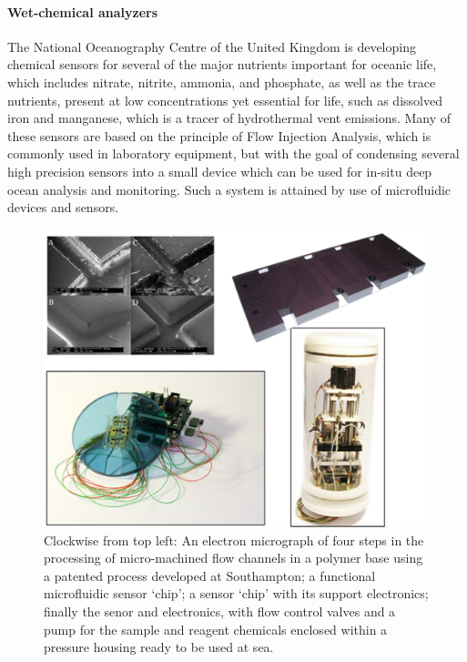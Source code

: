 {\paragraph{Wet-chemical analyzers \cite{chemical_microsensors}}
The National Oceanography Centre of the United Kingdom is developing chemical sensors for several of the major nutrients important for oceanic life, which includes nitrate, nitrite, ammonia, and phosphate, as well as the trace nutrients, present at low concentrations yet essential for life, such as dissolved iron and manganese, which is a tracer of hydrothermal vent emissions.  Many of these sensors are based on the principle of Flow Injection Analysis, which is commonly used in laboratory equipment, but with the goal of condensing several high precision sensors into a small device which can be used for in-situ deep ocean analysis and monitoring. Such a system is attained by use of microfluidic devices and sensors.
\begin{figure}[htb]
	\centering
	\includegraphics[width=\textwidth]{figures/mlh/microsensors_chem_img1.png}
	\caption{Clockwise from top left: An electron micrograph of four steps in the processing of micro-machined flow channels in a polymer base using a patented process developed at Southampton; a functional microfluidic sensor ‘chip’; a sensor ‘chip’ with its support electronics; finally the senor and electronics, with flow control valves and a pump for the sample and reagent chemicals enclosed within a pressure housing ready to be used at sea.\cite{chemical_microsensors}}
	\label{fig:chemical_microsensors}
\end{figure}

}
